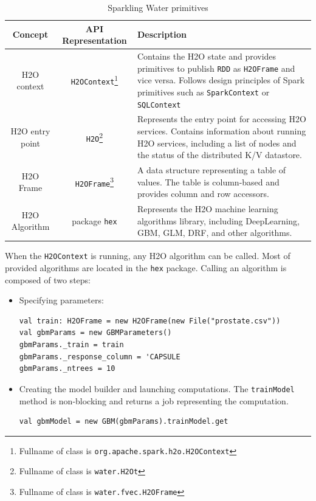 \documentclass{standalone}
\begin{document}
\begin{table}[!ht]
\centering

\begin{tabular}{c c p{5.2cm}}
\toprule
Concept & API Representation & Description \\
\midrule
H2O context & \texttt{H2OContext}\footnote{Fullname of class is \texttt{org.apache.spark.h2o.H2OContext}} & Contains the
H2O state and provides primitives to publish \texttt{RDD} as \texttt{H2OFrame} and
vice versa. Follows design principles of Spark primitives such as
\texttt{SparkContext} or \texttt{SQLContext} \\  \addlinespace

H2O entry point & \texttt{H2O}\footnote{Fullname of class is \texttt{water.H2Ot}} & Represents the entry point for accessing
H2O services. Contains information about running H2O services, including a list of
nodes and the status of the distributed K/V datastore. \\  \addlinespace

H2O Frame & \texttt{H2OFrame}\footnote{Fullname of class is \texttt{water.fvec.H2OFrame}} & A data structure 
representing a table of values. The table is column-based and provides column and
row accessors. \\  \addlinespace

H2O Algorithm & package \texttt{hex} & Represents the H2O machine learning
algorithms library, including DeepLearning, GBM, GLM, DRF, and other
algorithms. \\

\bottomrule
\end{tabular} 
\caption{Sparkling Water primitives}
\label{tab:primitives}
\end{table}

When the \texttt{H2OContext} is running, any H2O algorithm can be called. Most of provided algorithms are located in the \texttt{hex} package. Calling an algorithm is composed of two steps:

\begin{itemize}
	\item Specifying parameters:
\begin{lstlisting}[style=Scala]
val train: H2OFrame = new H2OFrame(new File("prostate.csv"))
val gbmParams = new GBMParameters()
gbmParams._train = train
gbmParams._response_column = 'CAPSULE
gbmParams._ntrees = 10
\end{lstlisting}

	\item Creating the model builder and launching computations. The \texttt{trainModel} method is non-blocking and returns a job representing the computation.
\begin{lstlisting}[style=Scala]
val gbmModel = new GBM(gbmParams).trainModel.get
\end{lstlisting}
\end{itemize}
\end{document}
